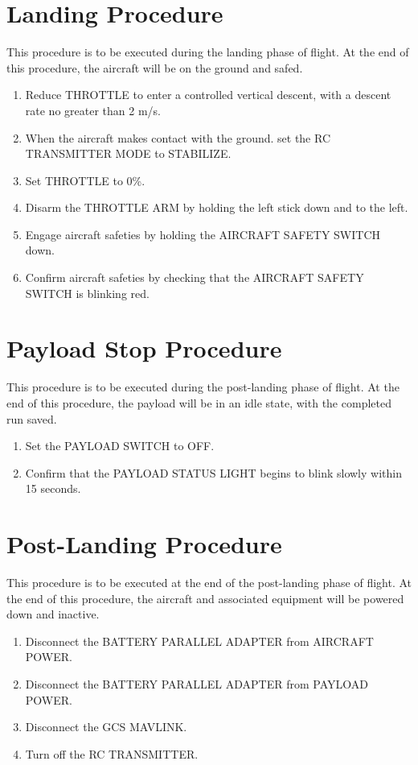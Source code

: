 \documentclass{report}
\begin{document}
	\section{Landing Procedure}
		This procedure is to be executed during the landing phase of flight.  At the end of this procedure, the aircraft will be on the ground and safed.
		\begin{enumerate}
			\item Reduce THROTTLE to enter a controlled vertical descent, with a descent rate no greater than 2 m/s.
			\item When the aircraft makes contact with the ground. set the RC TRANSMITTER MODE to STABILIZE.
			\item Set THROTTLE to 0\%.
			\item Disarm the THROTTLE ARM by holding the left stick down and to the left.
			\item Engage aircraft safeties by holding the AIRCRAFT SAFETY SWITCH down.
			\item Confirm aircraft safeties by checking that the AIRCRAFT SAFETY SWITCH is blinking red.
		\end{enumerate}
	\section{Payload Stop Procedure}
		This procedure is to be executed during the post-landing phase of flight.  At the end of this procedure, the payload will be in an idle state, with the completed run saved.
		\begin{enumerate}
			\item Set the PAYLOAD SWITCH to OFF.
			\item Confirm that the PAYLOAD STATUS LIGHT begins to blink slowly within 15 seconds.
		\end{enumerate}
	\section{Post-Landing Procedure}
		This procedure is to be executed at the end of the post-landing phase of flight.  At the end of this procedure, the aircraft and associated equipment will be powered down and inactive.
		\begin{enumerate}
			\item Disconnect the BATTERY PARALLEL ADAPTER from AIRCRAFT POWER.
			\item Disconnect the BATTERY PARALLEL ADAPTER from PAYLOAD POWER.
			\item Disconnect the GCS MAVLINK.
			\item Turn off the RC TRANSMITTER.
		\end{enumerate}
\end{document}
